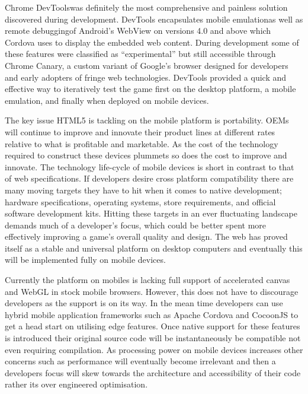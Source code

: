 \documentclass[final]{cmpreport}
\begin{document}
Chrome DevTools\footnotemark was definitely the most comprehensive and painless solution discovered during development. DevTools encapsulates mobile emulation\footnotemark as well as remote debugging\footnotemark of Android's WebView on versions 4.0 and above which Cordova uses to display the embedded web content. During development some of these features were classified as ``experimental'' but still accessible through Chrome Canary\footnotemark, a custom variant of Google's browser designed for developers and early adopters of fringe web technologies. DevTools provided a quick and effective way to iteratively test the game first on the desktop platform, a mobile emulation, and finally when deployed on mobile devices.


The key issue HTML5 is tackling on the mobile platform is portability. OEMs will continue to improve and innovate their product lines at different rates relative to what is profitable and marketable. As the cost of the technology required to construct these devices plummets so does the cost to improve and innovate. The technology life-cycle of mobile devices is short in contrast to that of web specifications. If developers desire cross platform compatibility there are many moving targets they have to hit when it comes to native development; hardware specifications, operating systems, store requirements, and official software development kits. Hitting these targets in an ever fluctuating landscape demands much of a developer's focus, which could be better spent more effectively improving a game's overall quality and design. The web has proved itself as a stable and universal platform on desktop computers and eventually this will be implemented fully on mobile devices.

Currently the platform on mobiles is lacking full support of accelerated canvas and WebGL in stock mobile browsers. However, this does not have to discourage developers as the support is on its way. In the mean time developers can use hybrid mobile application frameworks such as Apache Cordova and CocoonJS to get a head start on utilising edge features. Once native support for these features is introduced their original source code will be instantaneously be compatible not even requiring compilation. As processing power on mobile devices increases other concerns such as performance will eventually become irrelevant and then a developers focus will skew towards the architecture and accessibility of their code rather its over engineered optimisation.
\end{document}
